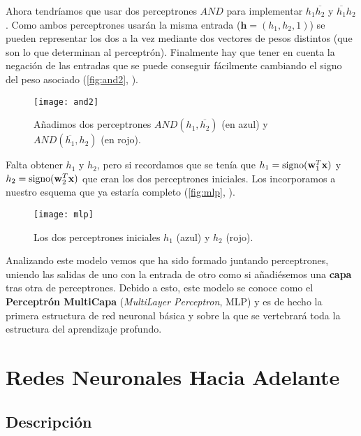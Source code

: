 Ahora tendríamos que usar dos perceptrones $AND$ para implementar $h_1\overline{h_2}$ y $\overline{h_1}h_2$. Como ambos perceptrones usarán la misma entrada ($\textbf{h} = (h_1, h_2, 1)$) se pueden representar los dos a la vez mediante dos vectores de pesos distintos (que son lo que determinan al perceptrón). Finalmente hay que tener en cuenta la negación de las entradas que se puede conseguir fácilmente cambiando el signo del peso asociado (\autoref{fig:and2}, \cite{abu2012learning}).

\begin{figure}[htpb]
  \centering
  \texttt{[image: and2]}
  \caption{Añadimos dos perceptrones $AND(h_1, \overline{h_2})$ (en azul) y $AND(\overline{h_1}, h_2)$ (en rojo).}
  \label{fig:and2}
\end{figure}

Falta obtener $h_1$ y $h_2$, pero si recordamos que se tenía que $h_1 = \operatorname{signo}(\textbf{w}^T_1 \textbf{x})$ y $h_2 = \operatorname{signo}(\textbf{w}^T_2 \textbf{x})$ que eran los dos perceptrones iniciales. Los incorporamos a nuestro esquema que ya estaría completo (\autoref{fig:mlp}, \cite{abu2012learning}).

\begin{figure}[htpb]
  \centering
  \texttt{[image: mlp]}
  \caption{Los dos perceptrones iniciales $h_1$ (azul) y $h_2$ (rojo).}
  \label{fig:mlp}
\end{figure}

Analizando este modelo vemos que ha sido formado juntando perceptrones, uniendo las salidas de uno con la entrada de otro como si añadiésemos una \textbf{capa} tras otra de perceptrones. Debido a esto, este modelo se conoce como el \textbf{Perceptrón MultiCapa} (\emph{MultiLayer Perceptron}, MLP) \cite{rumelhart1985learning} y es de hecho la primera estructura de red neuronal básica y sobre la que se vertebrará toda la estructura del aprendizaje profundo.

\section{Redes Neuronales Hacia Adelante}

\subsection{Descripción}

